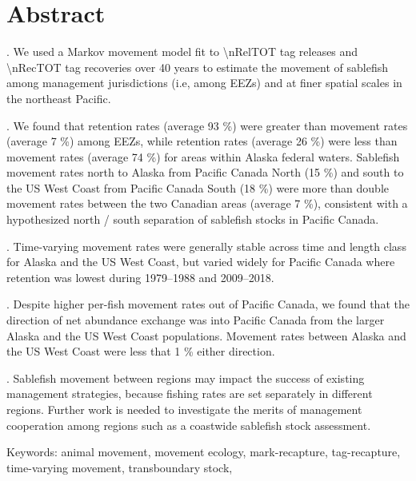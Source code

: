 \documentclass{article}
\begin{document}








\section{Abstract}
. We used a Markov movement model fit to \num{\nRelTOT} tag releases and \num{\nRecTOT} tag recoveries over 40 years to estimate the movement of  sablefish among management jurisdictions (i.e, among EEZs) and at finer spatial scales in the northeast Pacific.

. We found that retention rates (average 93 \%) were greater than movement rates (average 7 \%) among EEZs, while retention rates (average 26 \%) were less than movement rates (average 74 \%) for areas within Alaska federal waters. Sablefish movement rates north to Alaska from Pacific Canada North (15 \%) and south to the US West Coast from Pacific Canada South (18 \%) were more than double movement rates between the two Canadian areas (average 7 \%), consistent with a hypothesized north / south separation of sablefish stocks in Pacific Canada. 

. Time-varying movement rates were generally stable across time and length class for Alaska and the US West Coast, but varied widely for Pacific Canada where retention was lowest during 1979--1988 and 2009--2018.

. Despite higher per-fish movement rates out of Pacific Canada, we found that the direction of net abundance exchange was into Pacific Canada from the larger Alaska and the US West Coast populations. Movement rates between Alaska and the US West Coast were less that \num{1} \% either direction.

. Sablefish movement between regions may impact the success of existing management strategies, because fishing rates are set separately in different regions. Further work is needed to investigate the merits of management cooperation among regions such as a coastwide sablefish stock assessment.

\vspace{5mm}
\noindent Keywords: animal movement, movement ecology, mark-recapture, tag-recapture, time-varying movement, transboundary stock,
\end{document}
